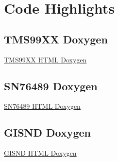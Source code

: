 \documentclass{article}
\begin{document}
  \newpage

  \section{Code Highlights}

  \subsection{TMS99XX Doxygen}
  \href{https://sparkletron.github.io/RODAC/manual/dox/tms99XX/html/index.html}{TMS99XX HTML Doxygen}

  \subsection{SN76489 Doxygen}
  \href{https://sparkletron.github.io/RODAC/manual/dox/sn76489/html/index.html}{SN76489 HTML Doxygen}

  \subsection{GISND Doxygen}
  \href{https://sparkletron.github.io/RODAC/manual/dox/gisnd/html/index.html}{GISND HTML Doxygen}
\end{document}

